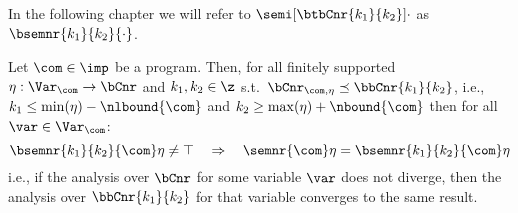 In the following chapter we will refer to
\(\semi[\btbCnr{k_1}{k_2}]{\cdot}\) as \(\bsemnr{k_1}{k_2}{\cdot}\).

\begin{theorem}
  Let \(\com\in\imp\) be a program. Then, for all finitely supported
  \(\eta : \Var_{\com} \to \bCnr\) and \(k_1, k_2 \in \z\) s.t.\
  \(\bCnr_{\com,\eta} \preceq \bbCnr{k_1}{k_2}\), i.e.,
  \(k_1 \leq \min(\eta) - \nlbound{\com}\) and
  \(k_2 \geq \max(\eta) + \nbound{\com}\) then for all
  \(\var\in\Var_{\com}\):
  \begin{equation*}
    \bsemnr{k_1}{k_2}{\com}\eta \neq \top \quad \Rightarrow \quad \semnr{\com}\eta = \bsemnr{k_1}{k_2}{\com}\eta
  \end{equation*}
  i.e., if the analysis over \(\bCnr\) for some variable \(\var\) does
  not diverge, then the analysis over \(\bbCnr{k_1}{k_2}\) for that
  variable converges to the same result.
\end{theorem}

